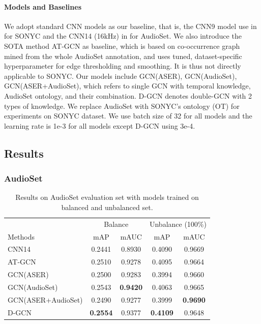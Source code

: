 \paragraph{Models and Baselines} We adopt standard CNN models as our baseline, that is, the CNN9 model use in \citep{kong2019cross} for SONYC and the CNN14 (16kHz) in \citep{kong2020panns} for AudioSet. We also introduce the SOTA method AT-GCN \citep{wang2020modeling} as baseline, which is based on co-occurrence graph mined from the whole AudioSet annotation, and uses tuned, dataset-specific hyperparameter for edge thresholding and smoothing. It is thus not directly applicable to SONYC. Our models include GCN(ASER), GCN(AudioSet), GCN(ASER+AudioSet), which refers to single GCN with temporal knowledge, AudioSet ontology, and their combination. D-GCN denotes double-GCN with 2 types of knowledge. We replace AudioSet with SONYC's ontology (OT) for experiments on SONYC dataset. We use batch size of 32 for all models and the learning rate is 1e-3 for all models except D-GCN using 3e-4.

\subsection{Results}

\subsubsection{AudioSet}


\begin{table}[tbp]
  \setlength{\belowcaptionskip}{-0.cm}
  \centering
  \small
  \begin{tabular}{lcccc}
      \hline
      {} & \multicolumn{2}{c}{Balance} & \multicolumn{2}{c}{Unbalance (100\%)} \\
      \cline{2-3}\cline{4-5} 
      Methods & mAP & mAUC & mAP & mAUC \\
      \hline
      CNN14 & 0.2441 & 0.8930 & 0.4090 & 0.9669 \\
      \hline
      AT-GCN & 0.2510 & 0.9278 & 0.4095 & 0.9664 \\
      GCN(ASER) & 0.2500 & 0.9283 & 0.3994 & 0.9660 \\
      GCN(AudioSet) & 0.2543 & \textbf{0.9420} & 0.4063 & 0.9665 \\
      GCN(ASER+AudioSet) & 0.2490 & 0.9277 & 0.3999 & \textbf{0.9690} \\
      D-GCN & \textbf{0.2554} & 0.9377 & \textbf{0.4109} & 0.9648 \\
      \hline
  \end{tabular}
  \caption{\label{tab:bal-unbal} Results on AudioSet evaluation set with models trained on balanced and unbalanced set.}
\end{table}

